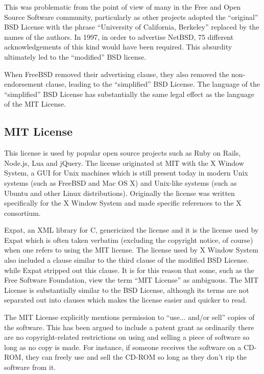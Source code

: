 \documentclass[12pt,letterpaper]{article}
\begin{document}
This was problematic from the point of view of many in the Free and Open Source Software community, particularly as other projects adopted the ``original'' BSD License with the phrase ``University of California, Berkeley'' replaced by the names of the authors. In 1997, in order to advertise NetBSD, 75 different acknowledgements of this kind would have been required. This absurdity ultimately led to the ``modified'' BSD license.

When FreeBSD removed their advertising clause, they also removed the non-endorsement clause, leading to the ``simplified'' BSD License. The language of the ``simplified'' BSD License has substantially the same legal effect as the language of the MIT License.

\subsection{MIT License}

This license is used by popular open source projects such as Ruby on Rails, Node.js, Lua and jQuery. The license originated at MIT with the X Window System, a GUI for Unix machines which is still present today in modern Unix systems (such as FreeBSD and Mac OS X) and Unix-like systems (such as Ubuntu and other Linux distributions). Originally the license was written specifically for the X Window System and made specific references to the X consortium.

Expat, an XML library for C, genericized the license and it is the license used by Expat which is often taken verbatim (excluding the copyright notice, of course) when one refers to using the MIT license. The license used by X Window System also included a clause similar to the third clause of the modified BSD License. while Expat stripped out this clause. It is for this reason that some, such as the Free Software Foundation, view the term ``MIT License'' as ambiguous. The MIT License is substantially similar to the BSD License, although its terms are not separated out into clauses which makes the license easier and quicker to read.

The MIT License explicitly mentions permission to ``use... and/or sell'' copies of the software. This has been argued to include a patent grant as ordinarily there are no copyright-related restrictions on using and selling a piece of software so long as no copy is made. For instance, if someone receives the software on a CD-ROM, they can freely use and sell the CD-ROM so long as they don't rip the software from it.
\end{document}

